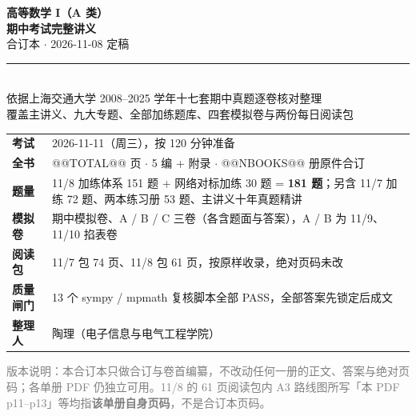 \documentclass[11pt,a4paper]{ctexart}
\begin{document}
\begin{center}
\vspace*{1.6cm}
{\Huge\bfseries 高等数学 I（A 类）}\\[6pt]
{\Huge\bfseries 期中考试完整讲义}\\[10pt]
{\Large 合订本 $\cdot$ 2026-11-08 定稿}\\[18pt]
\rule{0.82\linewidth}{0.6pt}\\[14pt]
{\large 依据上海交通大学 2008--2025 学年十七套期中真题逐卷核对整理}\\[4pt]
{\large 覆盖主讲义、九大专题、全部加练题库、四套模拟卷与两份每日阅读包}\\[16pt]
\end{center}

\begin{center}
\begin{tabular}{@{}ll@{}}
\textbf{考试} & 2026-11-11（周三），按 120 分钟准备 \\
\textbf{全书} & @@TOTAL@@ 页 $\cdot$ 5 编 + 附录 $\cdot$ @@NBOOKS@@ 册原件合订 \\
\textbf{题量} & 11/8 加练体系 151 题 + 网络对标加练 30 题 = \textbf{181 题}；另含 11/7 加练 72 题、两本练习册 53 题、主讲义十年真题精讲 \\
\textbf{模拟卷} & 期中模拟卷、A / B / C 三卷（各含题面与答案），A / B 为 11/9、11/10 掐表卷 \\
\textbf{阅读包} & 11/7 包 74 页、11/8 包 61 页，按原样收录，绝对页码未改 \\
\textbf{质量闸门} & 13 个 sympy / mpmath 复核脚本全部 PASS，全部答案先锁定后成文 \\
\textbf{整理人} & 陶理（电子信息与电气工程学院） \\
\end{tabular}
\end{center}

\vspace{0.7cm}
\begin{center}
\end{center}

\vspace{0.6cm}
\noindent\textcolor{gray}{\footnotesize 版本说明：本合订本只做合订与卷首编纂，不改动任何一册的正文、答案与绝对页码；各单册 PDF 仍独立可用。11/8 的 61 页阅读包内 A3 路线图所写「本 PDF p11--p13」等均指\textbf{该单册自身页码}，不是合订本页码。}
\end{document}

